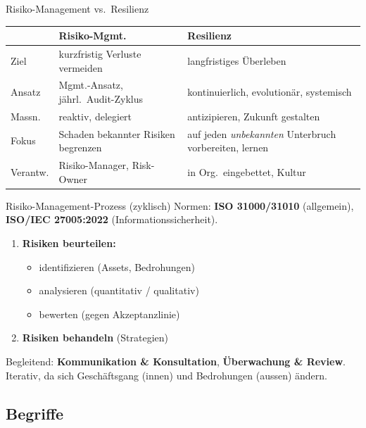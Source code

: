 \documentclass[a4paper, fontsize=7pt]{scrartcl}
\renewcommand*{\arraystretch}{1.5}  %
\begin{document}
\begin{mainbox}{Risiko-Management vs.\ Resilienz}
\renewcommand*{\arraystretch}{1.2}
\begin{tabularx}{\linewidth}{@{}l|X|X@{}}
& \textbf{Risiko-Mgmt.} & \textbf{Resilienz} \\
\hline
Ziel & kurzfristig Verluste vermeiden & langfristiges Überleben \\
Ansatz & Mgmt.-Ansatz, jährl.\ Audit-Zyklus & kontinuierlich, evolutionär,
systemisch \\
Massn. & reaktiv, delegiert & antizipieren, Zukunft gestalten \\
Fokus & Schaden bekannter Risiken begrenzen & auf jeden \emph{unbekannten}
Unterbruch vorbereiten, lernen \\
Verantw. & Risiko-Manager, Risk-Owner & in Org.\ eingebettet, Kultur \\
\end{tabularx}
\end{mainbox}

\begin{mainbox}{Risiko-Management-Prozess (zyklisch)}
Normen: \textbf{ISO 31000/31010} (allgemein), \textbf{ISO/IEC 27005:2022}
(Informationssicherheit).
\begin{enumerate}
    \item \textbf{Risiken beurteilen:}
    \begin{itemize}
        \item identifizieren (Assets, Bedrohungen)
        \item analysieren (quantitativ / qualitativ)
        \item bewerten (gegen Akzeptanzlinie)
    \end{itemize}
    \item \textbf{Risiken behandeln} (Strategien)
\end{enumerate}
Begleitend: \textbf{Kommunikation \& Konsultation}, \textbf{Überwachung \&
Review}. Iterativ, da sich Geschäftsgang (innen) und Bedrohungen (aussen) ändern.
\end{mainbox}

\subsection{Begriffe}
\end{document}
